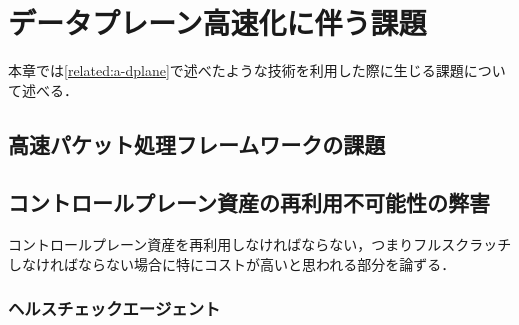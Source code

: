 \chapter{データプレーン高速化に伴う課題}
\label{issue}
本章では\ref{related:a-dplane}で述べたような技術を利用した際に生じる課題について述べる．
\section{高速パケット処理フレームワークの課題}

\label{issue:dplane}

\section{コントロールプレーン資産の再利用不可能性の弊害}
\label{issue:cplane}
コントロールプレーン資産を再利用しなければならない，つまりフルスクラッチしなければならない場合に特にコストが高いと思われる部分を論ずる．
\subsection{ヘルスチェックエージェント}






